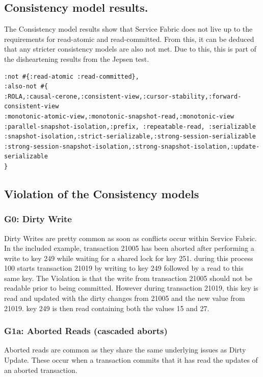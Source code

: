 \documentclass[a4paper,10pt,titlepage]{report}
\begin{document}
\subsection{Consistency model results.}
The Consistency model results show that Service Fabric does not live up to the requirements for read-atomic and read-committed. From this, it can be deduced that any stricter consistency models are also not met. Due to this, this is part of the disheartening results from the Jepsen test. 
\begin{lstlisting}
:not #{:read-atomic :read-committed},
:also-not #{
:ROLA,:causal-cerone,:consistent-view,:cursor-stability,:forward-consistent-view
:monotonic-atomic-view,:monotonic-snapshot-read,:monotonic-view
:parallel-snapshot-isolation,:prefix, :repeatable-read, :serializable
:snapshot-isolation,:strict-serializable,:strong-session-serializable
:strong-session-snapshot-isolation,:strong-snapshot-isolation,:update-serializable
}
\end{lstlisting}

\newpage
\subsection{Violation of the Consistency models}
\subsubsection{G0: Dirty Write}

Dirty Writes are pretty common as soon as conflicts occur within Service Fabric. In the included example, transaction 21005 has been aborted after performing a write to key 249 while waiting for a shared lock for key 251. during this process 100 starts transaction 21019 by writing to key 249 followed by a read to this same key. The Violation is that the write from transaction 21005 should not be readable prior to being committed. However during transaction 21019, this key is read and updated with the dirty changes from 21005 and the new value from 21019. key 249 is then read containing both the values 15 and 27.

    




\newpage
\subsubsection{G1a: Aborted Reads (cascaded aborts)}
Aborted reads are common as they share the same underlying issues as Dirty Update. These occur when a transaction commits that it has read the updates of an aborted transaction.\\
\end{document}
